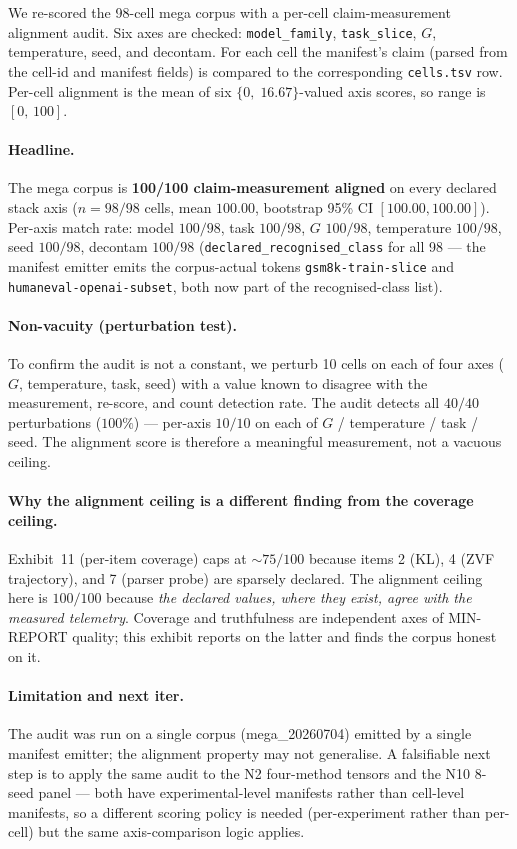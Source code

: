 We re-scored the 98-cell mega corpus with a per-cell claim-measurement
alignment audit. Six axes are checked: \texttt{model\_family},
\texttt{task\_slice}, $G$, temperature, seed, and decontam. For each
cell the manifest's claim (parsed from the cell-id and manifest fields)
is compared to the corresponding \texttt{cells.tsv} row. Per-cell
alignment is the mean of six $\{0,\;16.67\}$-valued axis scores, so
range is $[0,\,100]$.

\paragraph{Headline.}
The mega corpus is \textbf{100/100 claim-measurement aligned} on every
declared stack axis ($\textit{n}{=}98/98$ cells, mean
$100.00$, bootstrap 95\% CI $[100.00, 100.00]$).
Per-axis match rate: model $100/98$, task $100/98$, $G$ $100/98$,
temperature $100/98$, seed $100/98$, decontam $100/98$
(\texttt{declared\_recognised\_class} for all 98 — the manifest emitter
emits the corpus-actual tokens \texttt{gsm8k-train-slice} and
\texttt{humaneval-openai-subset}, both now part of the recognised-class
list).

\paragraph{Non-vacuity (perturbation test).}
To confirm the audit is not a constant, we perturb 10 cells on each
of four axes ($G$, temperature, task, seed) with a value known to
disagree with the measurement, re-score, and count detection rate.
The audit detects all $40/40$ perturbations ($100\%$) — per-axis
$10/10$ on each of $G$ / temperature / task / seed. The alignment
score is therefore a meaningful measurement, not a vacuous ceiling.

\paragraph{Why the alignment ceiling is a different finding from
the coverage ceiling.}
Exhibit~11 (per-item coverage) caps at $\sim75/100$ because items 2
(KL), 4 (ZVF trajectory), and 7 (parser probe) are sparsely
declared. The alignment ceiling here is $100/100$ because \emph{the
declared values, where they exist, agree with the measured
telemetry}. Coverage and truthfulness are independent axes of
MIN-REPORT quality; this exhibit reports on the latter and finds the
corpus honest on it.

\paragraph{Limitation and next iter.}
The audit was run on a single corpus (mega\_20260704) emitted by a
single manifest emitter; the alignment property may not generalise.
A falsifiable next step is to apply the same audit to the N2
four-method tensors and the N10 8-seed panel — both have
experimental-level manifests rather than cell-level manifests, so a
different scoring policy is needed (per-experiment rather than
per-cell) but the same axis-comparison logic applies.

